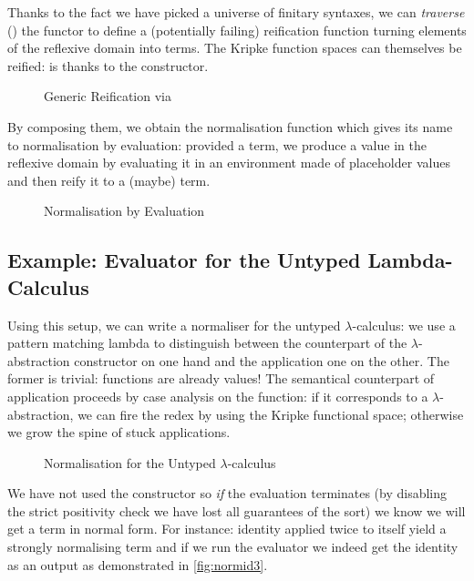 Thanks to the fact we have picked a universe of finitary syntaxes, we can
\emph{traverse} (\cite{mcbride_paterson_2008}) the functor to define a
(potentially failing) reification function turning elements of the reflexive
domain into terms. The Kripke function spaces can themselves be reified:
 is  thanks to the  constructor.

\begin{figure}[h]
\caption{Generic Reification via }
\end{figure}

By composing them, we obtain the normalisation function which gives its name
to normalisation by evaluation: provided a term, we produce a value in the
reflexive domain by evaluating it in an environment made of placeholder values
and then reify it to a (maybe) term.

\begin{figure}[h]
\caption{Normalisation by Evaluation}
\end{figure}

\subsection{Example: Evaluator for the Untyped Lambda-Calculus}

Using this setup, we can write a normaliser for the untyped $\lambda$-calculus:
we use a pattern matching lambda to distinguish between the counterpart of the
$\lambda$-abstraction constructor on one hand and the application one on the other.
The former is trivial: functions are already values! The semantical counterpart of
application proceeds by case analysis on the function: if it corresponds
to a $\lambda$-abstraction, we can fire the redex by using the Kripke functional space;
otherwise we grow the spine of stuck applications.

\begin{figure}[h]
\caption{Normalisation for the Untyped $\lambda$-calculus}
\end{figure}

We have not used the  constructor so \emph{if} the evaluation terminates
(by disabling the strict positivity check we have lost all guarantees of the sort)
we know we will get a term in normal form. For instance: identity applied twice
to itself yield a strongly normalising term and if we run the evaluator we indeed
get the identity as an output as demonstrated in \cref{fig:normid3}.

